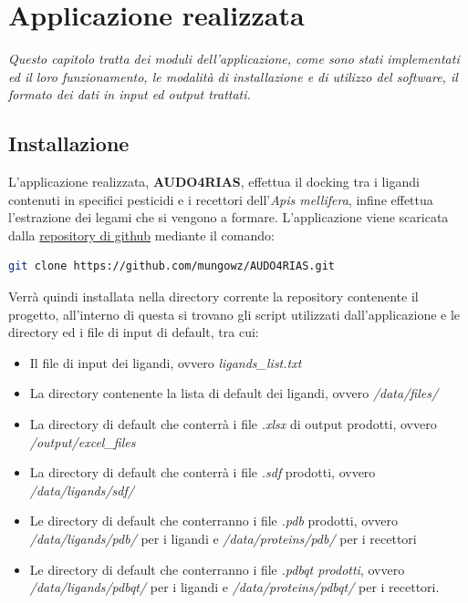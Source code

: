 \chapter{Applicazione realizzata}
\textit{Questo capitolo tratta dei moduli dell'applicazione, come sono stati implementati ed il loro funzionamento, le modalità di installazione e di utilizzo del software, il formato dei dati in input ed output trattati.}

\vskip 1cm

\section{Installazione}
L'applicazione realizzata, \textbf{AUDO4RIAS}, effettua il docking tra i ligandi contenuti in specifici pesticidi e i recettori dell'\textit{Apis mellifera}, infine effettua l'estrazione dei legami che si vengono a formare.\newline
L'applicazione viene scaricata dalla \href{https://github.com/mungowz/AUDO4RIAS.git}{repository di github} mediante il comando:

\begin{lstlisting}[language=Bash, label=lst:code1, caption={Comando per scaricare la repository}]
git clone https://github.com/mungowz/AUDO4RIAS.git
\end{lstlisting}

Verrà quindi installata nella directory corrente la repository contenente il progetto, all'interno di questa si trovano gli script utilizzati dall'applicazione e le directory ed i file di input di default, tra cui:

\begin{itemize}
    \item Il file di input dei ligandi, ovvero \textit{ligands\_list.txt}
    \item La directory contenente la lista di default dei ligandi, ovvero \textit{/data/files/}
    \item La directory di default che conterrà i file \textit{.xlsx} di output prodotti, ovvero \textit{/output/excel\_files}
    \item La directory di default che conterrà i file \textit{.sdf} prodotti, ovvero \textit{/data/ligands/sdf/}
    \item Le directory di default che conterranno i file \textit{.pdb} prodotti, ovvero \textit{/data/ligands/pdb/} per i ligandi e \textit{/data/proteins/pdb/} per i recettori
    \item Le directory di default che conterranno i file \textit{.pdbqt prodotti}, ovvero \textit{/data/ligands/pdbqt/} per i ligandi e \textit{/data/proteins/pdbqt/} per i recettori.
\end{itemize}

